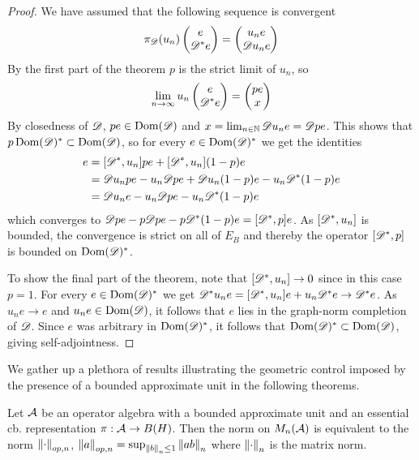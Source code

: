 \begin{proof}
	We have assumed that the following sequence is convergent
	\begin{align*}
		\pi_{\mathscr{D}}(u_n)\begin{pmatrix} e \\ \mathscr{D}^* e \end{pmatrix}=\begin{pmatrix} u_n e\\  \mathscr{D} u_n e\end{pmatrix}
	\end{align*}
	By the first part of the theorem $p$ is the strict limit of $u_n$, so 
	\begin{align*}
		\lim_{n\to \infty} u_n\begin{pmatrix} e \\ \mathscr{D}^* e \end{pmatrix}=\begin{pmatrix} pe\\  x \end{pmatrix}
	\end{align*}
	By closedness of $\mathscr{D}$, $pe\in \operatorname{Dom}(\mathscr{D})$ and $x=\lim_{n\in \mathbb{N}} \mathscr{D} u_n e=\mathscr{D} pe$. This shows that $p\operatorname{Dom}(\mathscr{D})^*\subset \operatorname{Dom}(\mathscr{D})$, so for every $e \in \operatorname{Dom}(\mathscr{D})^*$ we get the identities 
	\begin{align*}
		[\D^*,u_n]e&=[\D^*,u_n]pe+[\D^*,u_n](1-p)e \\
		&=\D u_npe-u_n \D pe+\D u_n(1-p)e-u_n \D^* (1-p)e \\
		&=\D u_n e-u_n \D pe -u_n \D^*(1-p)e 
	\end{align*}
	which converges to $\mathscr{D} pe-p\mathscr{D} pe -p \mathscr{D}^* (1-p)e=[\mathscr{D}^*,p]e$. As $[\mathscr{D}^*,u_n]$ is bounded, the convergence is strict on all of $E_B$ and thereby the operator $[\mathscr{D}^*,p]$ is bounded on $\operatorname{Dom}(\mathscr{D})^*$. 
	
	To show the final part of the theorem, note that $[\mathscr{D}^*,u_n]\to 0$ since in this case $p=1$. For every $e\in \operatorname{Dom}(\mathscr{D})^*$ we get $\mathscr{D}^*u_n e=[\mathscr{D}^*,u_n]e+u_n\mathscr{D}^*e\to \mathscr{D}^*e$. As $u_ne\to e$ and $u_n e\in \operatorname{Dom}(\mathscr{D})$, it follows that $e$ lies in the graph-norm completion of $\mathscr{D}$. Since $e$ was arbitrary in $\operatorname{Dom}(\mathscr{D})^*$, it follows that $\operatorname{Dom}(\mathscr{D})^*\subset \operatorname{Dom}(\mathscr{D})$, giving self-adjointness. 
	
\end{proof}
We gather up a plethora of results illustrating the geometric control imposed by the presence of a bounded approximate unit in the following theorems. 
\begin{theorem}\label{mesrennie112}
	Let $\mathcal{A}$ be an operator algebra with a bounded approximate unit and an essential cb. representation $\pi:\mathcal{A}\to B(H)$. Then the norm on $M_n(\mathcal{A})$ is equivalent to the norm $\left \Vert \cdot \right \Vert_{op,n}$, $\left \Vert a \right \Vert_{op,n}=\sup_{\left \Vert b \right \Vert_n\leq 1}\left \Vert ab \right \Vert_n$ where $\left \Vert \cdot \right \Vert_n$ is the matrix norm. 
\end{theorem}

